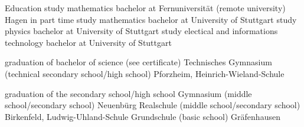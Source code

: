 \versionLanguageStart%
\begin{rubric}{\textcolor{black!20!blue!100}{Education}}%
		study mathematics bachelor at Fernuniversität (remote university) Hagen in part time
	\entry*[10/2014 --- 03/2018]
		study mathematics bachelor at University of Stuttgart
	\entry*[10/2013 --- 09/2016]
		study physics bachelor at University of Stuttgart
	\entry*[10/2012 --- 08/2016]
		study electical and informations technology bachelor at University of Stuttgart
		
		graduation of bachelor of science (see certificate)
	\entry*[09/2009 --- 06/2012]
		Technisches Gymnasium (technical secondary school/high school) Pforzheim, Heinrich-Wieland-Schule
		
		graduation of the secondary school/high school
	\entry*[09/2005 --- 07/2009]
		Gymnasium (middle school/secondary school) Neuenbürg
	\entry*[09/2004 --- 07/2005]
		Realschule (middle school/secondary school) Birkenfeld, Ludwig-Uhland-Schule
	\entry*[09/2000 --- 07/2004]
		Grundschule (basic school) Gräfenhausen
\end{rubric}
\versionLanguageEnd